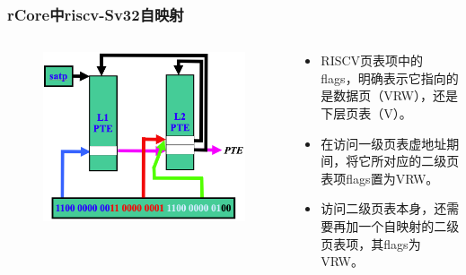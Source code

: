 \begin{frame}
    \frametitle{rCore中riscv-Sv32自映射}

    \begin{columns}
    \begin{column}{0.6\textwidth}
        \begin{figure}
        \includegraphics[width=0.9\linewidth]{figs/riscv32-self-mapping.png}
        \end{figure}
    \end{column} \pause
    \begin{column}{0.4\textwidth}
        \begin{itemize}
            \item RISCV页表项中的flags，明确表示它指向的是数据页（VRW），还是下层页表（V）。
            \item 在访问一级页表虚地址期间，将它所对应的二级页表项flags置为VRW。
            \item 访问二级页表本身，还需要再加一个自映射的二级页表项，其flags为VRW。
        \end{itemize}
    \end{column}
    \end{columns}

\end{frame}
% 
% 
% 

